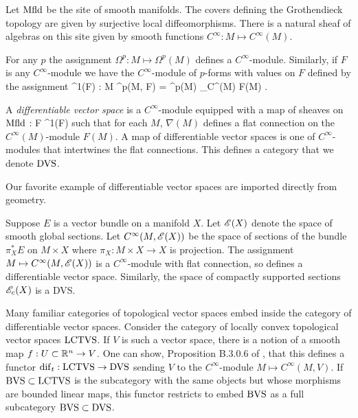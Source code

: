 Let ${\rm Mfld}$ be the site of smooth manifolds.
The covers defining the Grothendieck topology are given by surjective local diffeomorphisms.
There is a natural sheaf of algebras on this site given by smooth functions $C^\infty : M \mapsto C^\infty(M)$. 

For any $p$ the assignment $\Omega^p : M \mapsto \Omega^p (M)$ defines a $C^\infty$-module.
Similarly, if $F$ is any $C^\infty$-module we have the $C^\infty$-module of $p$-forms with values on $F$ defined by the assignment 
\ben
\Omega^1(F) : M  \mapsto \Omega^p(M, F) = \Omega^p(M) \tensor_{C^\infty(M)} F(M) .
\een

\begin{dfn}
A {\em differentiable vector space} is a $C^\infty$-module equipped with a map of sheaves on ${\rm Mfld}$
\ben
\nabla : F \to \Omega^1(F) 
\een 
such that for each $M$, $\nabla(M)$ defines a flat connection on the $C^\infty(M)$-module $F(M)$. 
A map of differentiable vector spaces is one of $C^\infty$-modules that intertwines the flat connections. 
This defines a category that we denote ${\rm DVS}$.
\end{dfn}

Our favorite example of differentiable vector spaces are imported directly from geometry.

\begin{eg}
Suppose $E$ is a vector bundle on a manifold $X$. 
Let $\mathscr E(X)$ denote the space of smooth global sections.
Let $C^\infty(M, \mathscr E(X))$ be the space of sections of the bundle $\pi_X^*E$ on $M \times X$ where $\pi_X : M \times X \to X$ is projection. 
The assignment $M \mapsto C^\infty(M , \mathscr E(X))$ is a $C^\infty$-module with flat connection, so defines a differentiable vector space.
Similarly, the space of compactly supported sections $\mathscr E_c(X)$ is a DVS. 
\end{eg}

Many familiar categories of topological vector spaces embed inside the category of differentiable vector spaces. 
Consider the category of locally convex topological vector spaces ${\rm LCTVS}$.
If $V$ is such a vector space, there is a notion of a smooth map $f : U \subset \mathbb R^n \to V$.
One can show, Proposition B.3.0.6 of \cite{CG1}, that this defines a functor ${\rm dif}_t : {\rm LCTVS} \to {\rm DVS}$ sending $V$ to the $C^\infty$-module $M \mapsto C^\infty(M, V)$.
If ${\rm BVS} \subset {\rm LCTVS}$ is the subcategory with the same objects but whose morphisms are bounded linear maps, this functor restricts to embed ${\rm BVS}$ as a full subcategory ${\rm BVS} \subset {\rm DVS}$. 

